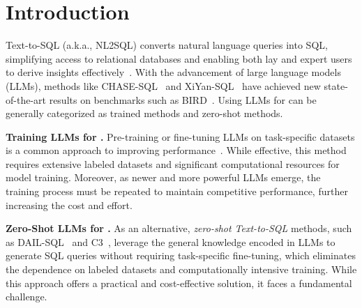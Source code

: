 \section{Introduction}
\label{sec:introduction}






Text-to-SQL (a.k.a., NL2SQL) converts natural language queries into SQL, simplifying access to relational databases and enabling both lay and expert users to derive insights effectively~\cite{nl2sql-survey, supersql}. 
With the advancement of large language models (LLMs), methods like CHASE-SQL~\cite{CHASE} and XiYan-SQL~\cite{XiYan} have achieved new state-of-the-art results on benchmarks such as BIRD~\cite{bird}. Using LLMs for \nlsql can be generally categorized as trained methods and zero-shot methods.
 
\textbf{Training LLMs for \nlsql.} 
Pre-training or fine-tuning LLMs on task-specific datasets is a common approach to improving \nlsql performance~\cite{codes, XiYan,chesssql}. While effective, this method requires extensive labeled datasets and significant computational resources for model training. Moreover, as newer and more powerful LLMs emerge, the training process must be repeated to maintain competitive performance, further increasing the cost and effort.

\textbf{Zero-Shot LLMs for \nlsql.}
As an alternative, \textit{zero-shot Text-to-SQL} methods, such as DAIL-SQL~\cite{dailsql} and C3~\cite{c3}, leverage the general knowledge encoded in LLMs to generate SQL queries without requiring task-specific fine-tuning, which eliminates the dependence on labeled datasets and computationally intensive training.
While this approach offers a practical and cost-effective solution, it faces a fundamental challenge.

